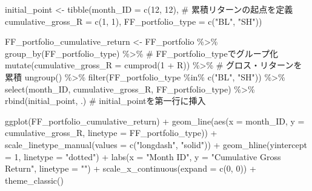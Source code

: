 \documentclass[
  letterpaper,
  DIV=11,
  numbers=noendperiod]{scrreprt}
\newenvironment{Shaded}{\begin{snugshade}}{\end{snugshade}}
\newcommand{\AttributeTok}[1]{\textcolor[rgb]{0.40,0.45,0.13}{#1}}
\newcommand{\CommentTok}[1]{\textcolor[rgb]{0.37,0.37,0.37}{#1}}
\newcommand{\DecValTok}[1]{\textcolor[rgb]{0.68,0.00,0.00}{#1}}
\newcommand{\FunctionTok}[1]{\textcolor[rgb]{0.28,0.35,0.67}{#1}}
\newcommand{\NormalTok}[1]{\textcolor[rgb]{0.00,0.23,0.31}{#1}}
\newcommand{\OtherTok}[1]{\textcolor[rgb]{0.00,0.23,0.31}{#1}}
\newcommand{\SpecialCharTok}[1]{\textcolor[rgb]{0.37,0.37,0.37}{#1}}
\newcommand{\StringTok}[1]{\textcolor[rgb]{0.13,0.47,0.30}{#1}}
\begin{document}
\begin{Shaded}
\begin{Highlighting}[]
\NormalTok{initial\_point }\OtherTok{\textless{}{-}} \FunctionTok{tibble}\NormalTok{(}\AttributeTok{month\_ID =} \FunctionTok{c}\NormalTok{(}\DecValTok{12}\NormalTok{, }\DecValTok{12}\NormalTok{), }\CommentTok{\# 累積リターンの起点を定義}
                            \AttributeTok{cumulative\_gross\_R =} \FunctionTok{c}\NormalTok{(}\DecValTok{1}\NormalTok{, }\DecValTok{1}\NormalTok{), }
                            \AttributeTok{FF\_portfolio\_type =} \FunctionTok{c}\NormalTok{(}\StringTok{"BL"}\NormalTok{, }\StringTok{"SH"}\NormalTok{))}

\NormalTok{FF\_portfolio\_cumulative\_return }\OtherTok{\textless{}{-}}\NormalTok{ FF\_portfolio }\SpecialCharTok{\%\textgreater{}\%} 
  \FunctionTok{group\_by}\NormalTok{(FF\_portfolio\_type) }\SpecialCharTok{\%\textgreater{}\%} \CommentTok{\# FF\_portfolio\_typeでグループ化}
  \FunctionTok{mutate}\NormalTok{(}\AttributeTok{cumulative\_gross\_R =} \FunctionTok{cumprod}\NormalTok{(}\DecValTok{1} \SpecialCharTok{+}\NormalTok{ R)) }\SpecialCharTok{\%\textgreater{}\%} \CommentTok{\# グロス・リターンを累積}
  \FunctionTok{ungroup}\NormalTok{() }\SpecialCharTok{\%\textgreater{}\%} 
  \FunctionTok{filter}\NormalTok{(FF\_portfolio\_type }\SpecialCharTok{\%in\%} \FunctionTok{c}\NormalTok{(}\StringTok{"BL"}\NormalTok{, }\StringTok{"SH"}\NormalTok{)) }\SpecialCharTok{\%\textgreater{}\%}
  \FunctionTok{select}\NormalTok{(month\_ID, cumulative\_gross\_R, FF\_portfolio\_type) }\SpecialCharTok{\%\textgreater{}\%}
  \FunctionTok{rbind}\NormalTok{(initial\_point, .) }\CommentTok{\# initial\_pointを第一行に挿入}

\FunctionTok{ggplot}\NormalTok{(FF\_portfolio\_cumulative\_return) }\SpecialCharTok{+}
  \FunctionTok{geom\_line}\NormalTok{(}\FunctionTok{aes}\NormalTok{(}\AttributeTok{x =}\NormalTok{ month\_ID, }\AttributeTok{y =}\NormalTok{ cumulative\_gross\_R, }\AttributeTok{linetype =}\NormalTok{ FF\_portfolio\_type)) }\SpecialCharTok{+} 
  \FunctionTok{scale\_linetype\_manual}\NormalTok{(}\AttributeTok{values =} \FunctionTok{c}\NormalTok{(}\StringTok{"longdash"}\NormalTok{, }\StringTok{"solid"}\NormalTok{)) }\SpecialCharTok{+}
  \FunctionTok{geom\_hline}\NormalTok{(}\AttributeTok{yintercept =} \DecValTok{1}\NormalTok{, }\AttributeTok{linetype =} \StringTok{"dotted"}\NormalTok{) }\SpecialCharTok{+} 
  \FunctionTok{labs}\NormalTok{(}\AttributeTok{x =} \StringTok{"Month ID"}\NormalTok{, }\AttributeTok{y =} \StringTok{"Cumulative Gross Return"}\NormalTok{, }\AttributeTok{linetype =} \StringTok{""}\NormalTok{) }\SpecialCharTok{+}
  \FunctionTok{scale\_x\_continuous}\NormalTok{(}\AttributeTok{expand =} \FunctionTok{c}\NormalTok{(}\DecValTok{0}\NormalTok{, }\DecValTok{0}\NormalTok{)) }\SpecialCharTok{+} 
  \FunctionTok{theme\_classic}\NormalTok{()}
\end{Highlighting}
\end{Shaded}
\end{document}
